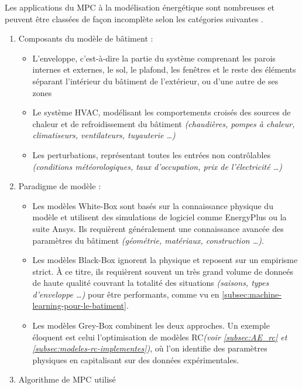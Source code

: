         Les applications du MPC à la modélisation énergétique sont nombreuses
        et peuvent être classées de façon incomplète selon les catégories suivantes
        \cite{allyouneedtoknowaboutMPCforbuildings,KATHIRGAMANATHAN2021110120}.
        \begin{enumerate}
            \item Composants du modèle de bâtiment : \begin{itemize}
               \item L'enveloppe, c'est-à-dire la partie du système comprenant les parois internes et externes, le sol, le plafond, les fenêtres et le reste des éléments séparant l'intérieur du bâtiment de l'extérieur, ou d'une autre de ses zones
               \item Le système \gls{HVAC}, modélisant les comportements croisés des sources de chaleur et de refroidissement du bâtiment \textit{(chaudières, pompes à chaleur, climatiseurs, ventilateurs, tuyauterie \ldots)}
               \item Les perturbations, représentant toutes les entrées non contrôlables \textit{(conditions météorologiques, taux d'occupation, prix de l'électricité \ldots)}
            \end{itemize}
            \item Paradigme de modèle : \begin{itemize}
                \item Les modèles White-Box sont basés sur la connaissance physique du
                modèle et utilisent des simulations de logiciel comme EnergyPlus ou la suite
                Ansys.
                Ils requièrent généralement une connaissance avancée des paramètres
                du bâtiment \textit{(géométrie, matériaux, construction \ldots)}.
                \item Les modèles Black-Box ignorent la physique et reposent sur un
                empirisme strict.
                À ce titre, ils requièrent souvent un très grand volume de donneés
                de haute qualité couvrant la totalité des situations
                \textit{(saisons, types d'enveloppe \ldots)} pour être performants, comme vu en \ref{subsec:machine-learning-pour-le-batiment}.
                \item Les modèles Grey-Box combinent les deux approches.
                Un exemple éloquent est celui l'optimisation de modèles RC\textit{(voir \ref{subsec:AE_rc} et \ref{subsec:modeles-rc-implementes})}, où l'on identifie des
                paramètres physiques en capitalisant sur des données expérimentales.
            \end{itemize}
            \item Algorithme de MPC utilisé
        \end{enumerate}

